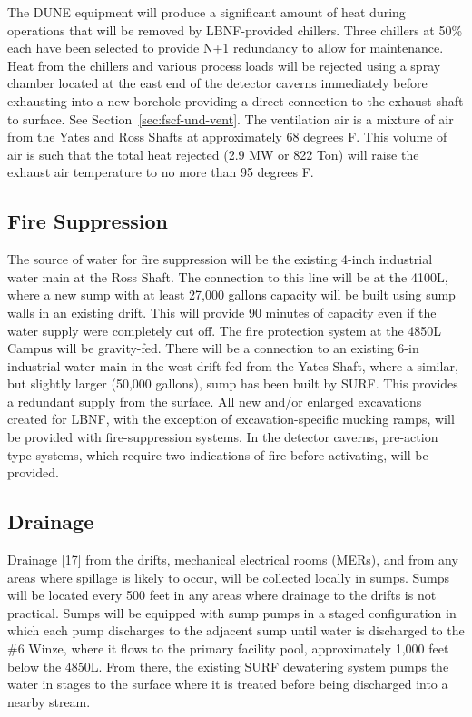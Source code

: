 The DUNE equipment will produce a significant amount of heat during operations that will be removed by LBNF-provided chillers. Three chillers at 50\%  each  have been selected to provide N+1 redundancy to allow for maintenance. Heat from the chillers and various process loads will be rejected using a spray chamber located at the east end of the detector caverns immediately before exhausting into a new borehole providing a direct connection to the exhaust shaft to surface. See Section~\ref{sec:fscf-und-vent}.  The ventilation air is a mixture of air from the Yates and Ross Shafts at approximately 68 degrees F. This volume of air is such that the total heat rejected (2.9 MW or 822 Ton) will raise the exhaust air temperature to no more than 95 degrees F. 



\subsection{Fire Suppression}
\label{sec:fscf-und-fire-supp}

The source of water for fire suppression will be the existing 4-inch industrial water main at the Ross Shaft. The connection to this line will be at the 4100L, where a new sump with at least 27,000 gallons capacity will be built using sump walls in an existing drift. This will provide 90 minutes of capacity even if the water supply were completely cut off.  The fire protection system at the 4850L Campus will be gravity-fed. There will be a connection to an existing 6-in industrial water main in the west drift fed from the Yates Shaft, where a similar, but slightly larger (50,000 gallons), sump has been built by SURF. This provides a redundant supply from the surface.  All new and/or enlarged excavations created for LBNF, with the exception of excavation-specific mucking ramps, will be provided with fire-suppression systems.  In the detector caverns, pre-action type systems, which require two indications of fire before activating, will be provided.


\subsection{Drainage}
\label{sec:fscf-und-drain}

Drainage [17] from the drifts, mechanical electrical rooms (MERs), and from any areas where spillage is likely to occur, will be collected locally in sumps. Sumps will be located every 500 feet in any areas where drainage to the drifts is not practical. Sumps will be equipped with sump pumps in a staged configuration in which each pump discharges to the adjacent sump until water is discharged to the \#6 Winze, where it flows to the primary facility pool, approximately 1,000 feet below the 4850L. From there, the existing SURF dewatering system pumps the water in stages to the surface where it is treated before being discharged into a nearby stream.

